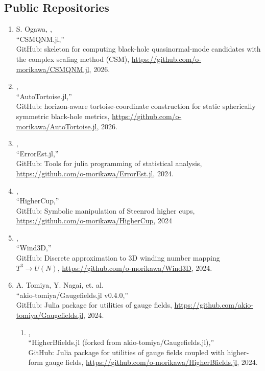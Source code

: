 \subsection{Public Repositories}
\begin{enumerate}
 \item S. Ogawa, \OM,\\
       ``CSMQNM.jl,''\\
       GitHub: skeleton for computing black-hole quasinormal-mode candidates with the complex scaling method (CSM),
       \url{https://github.com/o-morikawa/CSMQNM.jl}, 2026.
 \item \OM,\\
       ``AutoTortoise.jl,''\\
       GitHub: horizon-aware tortoise-coordinate construction for static spherically symmetric black-hole metrics,
       \url{https://github.com/o-morikawa/AutoTortoise.jl}, 2026.
 \item \OM,\\
       ``ErrorEst.jl,''\\
       GitHub:
       Tools for julia programming of statistical analysis,
       \url{https://github.com/o-morikawa/ErrorEst.jl}, 2024.
 \item \OM,\\
       ``HigherCup,''\\
       GitHub:
       Symbolic manipulation of Steenrod higher cups,
       \url{https://github.com/o-morikawa/HigherCup}, 2024
 \item \OM,\\
       ``Wind3D,''\\
       GitHub:
       Discrete approximation to $3$D winding number mapping $T^3\to U(N)$,
       \url{https://github.com/o-morikawa/Wind3D}, 2024.
 \item A. Tomiya, Y. Nagai, et. al.\\
       ``akio-tomiya/Gaugefields.jl v0.4.0,''\\
       GitHub:
       Julia package for utilities of gauge fields,
       \url{https://github.com/akio-tomiya/Gaugefields.jl}, 2024.
       \begin{enumerate}
	\item \OM,\\
	      ``HigherBfields.jl (forked from akio-tomiya/Gaugefields.jl),''\\
	      GitHub:
	      Julia package for utilities of gauge fields coupled with higher-form gauge fields,
	      \url{https://github.com/o-morikawa/HigherBfields.jl}, 2024.

\end{enumerate}
\end{enumerate}
